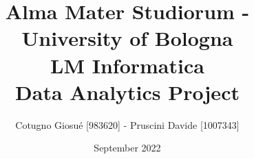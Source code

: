 \documentclass[11pt, openany]{book}
\title{Alma Mater Studiorum - University of Bologna \\ LM Informatica \\ \textbf{Data Analytics Project}}
\author{Cotugno Giosu\'e [983620] - Pruscini Davide [1007343]}
\date{September 2022}
\begin{document}
\maketitle

\tableofcontents











\renewcommand{\bibname}{References}


\end{document}
